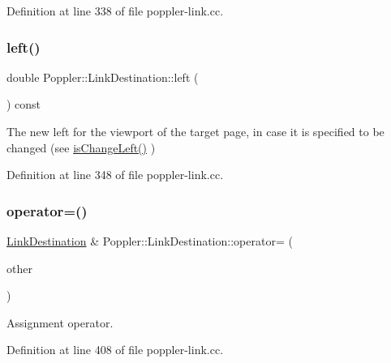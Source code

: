 Definition at line 338 of file poppler-\/link.\+cc.

\mbox{\label{class_poppler_1_1_link_destination_a408de2b77a52aead8f1782ad464c8e3e}} 
\subsubsection{\texorpdfstring{left()}{left()}}
{\footnotesize\ttfamily double Poppler\+::\+Link\+Destination\+::left (\begin{DoxyParamCaption}{ }\end{DoxyParamCaption}) const}

The new left for the viewport of the target page, in case it is specified to be changed (see \hyperlink{class_poppler_1_1_link_destination_a523f8bfa4ae35647d2c00f14ca6bca5f}{is\+Change\+Left()} ) 

Definition at line 348 of file poppler-\/link.\+cc.

\mbox{\label{class_poppler_1_1_link_destination_a1a1c6b10e0d3e2de275b0cc491a25f92}} 
\subsubsection{\texorpdfstring{operator=()}{operator=()}}
{\footnotesize\ttfamily \hyperlink{class_poppler_1_1_link_destination}{Link\+Destination} \& Poppler\+::\+Link\+Destination\+::operator= (\begin{DoxyParamCaption}\item[{const \hyperlink{class_poppler_1_1_link_destination}{Link\+Destination} \&}]{other }\end{DoxyParamCaption})}

Assignment operator. 

Definition at line 408 of file poppler-\/link.\+cc.

\mbox{\label{class_poppler_1_1_link_destination_a618f5280d20902bb83e99e7894ddbafe}} 
